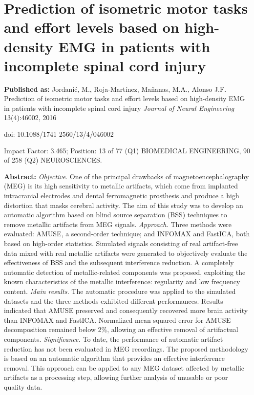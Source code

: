 \chapter{Prediction of isometric motor tasks and effort levels based on high-density EMG in patients with incomplete spinal cord injury}
\label{ch:3}
\textbf{Published as:} 
Jordanić, M., Roja-Martínez,  Ma\~nanas, M.A., Alonso J.F.
Prediction of isometric motor tasks and effort levels based on high-density EMG in patients with incomplete spinal cord injury \textit{Journal of Neural Engineering} 13(4):46002, 2016

doi: 10.1088/1741-2560/13/4/046002

Impact Factor: 3.465; Position: 13 of 77 (Q1) BIOMEDICAL ENGINEERING, 90 of 258 (Q2) NEUROSCIENCES.


\textbf{Abstract:} \textit{Objective}. One of the principal drawbacks of magnetoencephalography (MEG) is its high sensitivity to metallic artifacts, which come from implanted intracranial electrodes and dental ferromagnetic prosthesis and produce a high distortion that masks cerebral activity. The aim of this study was to develop an automatic algorithm based on blind source separation (BSS) techniques to remove metallic artifacts from MEG signals. \textit{Approach.} Three methods were evaluated: AMUSE, a second-order technique; and INFOMAX and FastICA, both based on high-order statistics. Simulated signals consisting of real artifact-free data mixed with real metallic artifacts were generated to objectively evaluate the effectiveness of BSS and the subsequent interference reduction. A completely automatic detection of metallic-related components was proposed, exploiting the known characteristics of the metallic interference: regularity and low frequency content. \textit{Main results.} The automatic procedure was applied to the simulated datasets and the three methods exhibited different performances. Results indicated that AMUSE preserved and consequently recovered more brain activity than INFOMAX and FastICA. Normalized mean squared error for AMUSE decomposition remained below 2\%, allowing an effective removal of artifactual components. \textit{Significance.} To date, the performance of automatic artifact reduction has not been evaluated in MEG recordings. The proposed methodology is based on an automatic algorithm that provides an effective interference removal. This approach can be applied to any MEG dataset affected by metallic artifacts as a processing step, allowing further analysis of unusable or poor quality data.

